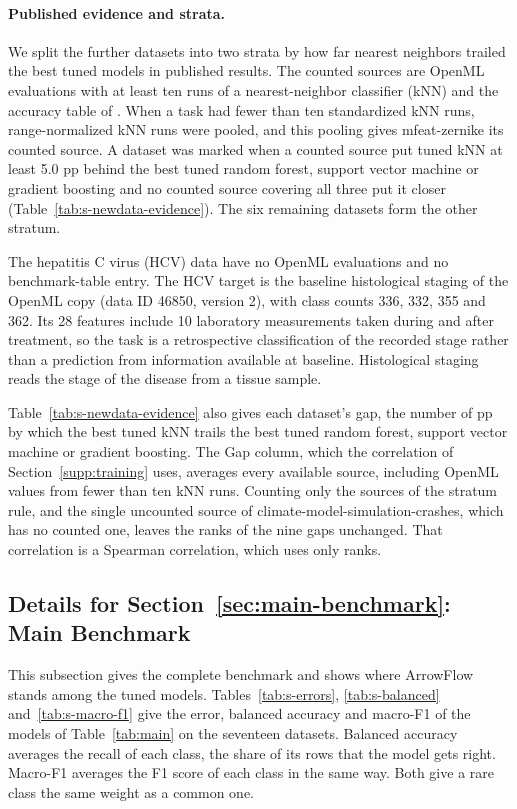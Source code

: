 \paragraph{Published evidence and strata.} We split the further datasets into two strata by how far nearest neighbors trailed the best tuned models in published results. The counted sources are OpenML evaluations with at least ten runs of a nearest-neighbor classifier (kNN) and the accuracy table of \citet{fernandezdelgado2014hundreds}. When a task had fewer than ten standardized kNN runs, range-normalized kNN runs were pooled, and this pooling gives mfeat-zernike its counted source. A dataset was marked when a counted source put tuned kNN at least 5.0 pp behind the best tuned random forest, support vector machine or gradient boosting and no counted source covering all three put it closer (Table~\ref{tab:s-newdata-evidence}). The six remaining datasets form the other stratum.

The hepatitis C virus (HCV) data have no OpenML evaluations and no benchmark-table entry. The HCV target is the baseline histological staging of the OpenML copy (data ID 46850, version 2), with class counts 336, 332, 355 and 362. Its 28 features include 10 laboratory measurements taken during and after treatment, so the task is a retrospective classification of the recorded stage rather than a prediction from information available at baseline. Histological staging reads the stage of the disease from a tissue sample.

Table~\ref{tab:s-newdata-evidence} also gives each dataset's gap, the number of pp by which the best tuned kNN trails the best tuned random forest, support vector machine or gradient boosting. The Gap column, which the correlation of Section~\ref{supp:training} uses, averages every available source, including OpenML values from fewer than ten kNN runs. Counting only the sources of the stratum rule, and the single uncounted source of climate-model-simulation-crashes, which has no counted one, leaves the ranks of the nine gaps unchanged. That correlation is a Spearman correlation, which uses only ranks.



\FloatBarrier
\subsection{Details for Section~\ref*{sec:main-benchmark}: Main Benchmark}\label{supp:benchmark}

This subsection gives the complete benchmark and shows where ArrowFlow stands among the tuned models. Tables~\ref{tab:s-errors}, \ref{tab:s-balanced} and~\ref{tab:s-macro-f1} give the error, balanced accuracy and macro-F1 of the models of Table~\ref{tab:main} on the seventeen datasets. Balanced accuracy averages the recall of each class, the share of its rows that the model gets right. Macro-F1 averages the F1 score of each class in the same way. Both give a rare class the same weight as a common one.

